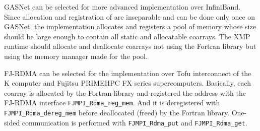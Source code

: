 GASNet can be selected for more advanced implementation over InfiniBand. 
Since allocation and registration of are inseparable and can be done only once 
on GASNet, the implementation allocates and registers a pool of memory
whose size should be large enough to contain all static and allocatable coarrays.
The XMP runtime should allocate and deallocate coarrays not using the Fortran 
library but using the memory manager made for the pool.

FJ-RDMA can be selected for the implementation over Tofu interconnect of 
the K computer and Fujitsu PRIMEHPC FX series supercomputers. 
Basically, each coarray is allocated by the Fortran library and registered 
the address with the FJ-RDMA interface {\tt FJMPI\_Rdma\_reg\_mem}. 
And it is deregistered with {\tt FJMPI\_Rdma\_dereg\_mem} before deallocated 
(freed) by the Fortran library. 
One-sided communication is performed with {\tt FJMPI\_Rdma\_put} and 
{\tt FJMPI\_Rdma\_get}.



